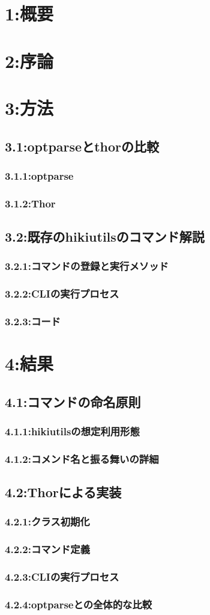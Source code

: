 \section{1:概要}
\section{2:序論}
\section{3:方法}
\subsection{3.1:optparseとthorの比較}
\subsubsection{3.1.1:optparse}
\subsubsection{3.1.2:Thor}
\subsection{3.2:既存のhikiutilsのコマンド解説}
\subsubsection{3.2.1:コマンドの登録と実行メソッド}
\subsubsection{3.2.2:CLIの実行プロセス}
\subsubsection{3.2.3:コード}
\section{4:結果}
\subsection{4.1:コマンドの命名原則}
\subsubsection{4.1.1:hikiutilsの想定利用形態}
\subsubsection{4.1.2:コメンド名と振る舞いの詳細}
\subsection{4.2:Thorによる実装}
\subsubsection{4.2.1:クラス初期化}
\subsubsection{4.2.2:コマンド定義}
\subsubsection{4.2.3:CLIの実行プロセス}
\subsubsection{4.2.4:optparseとの全体的な比較}
